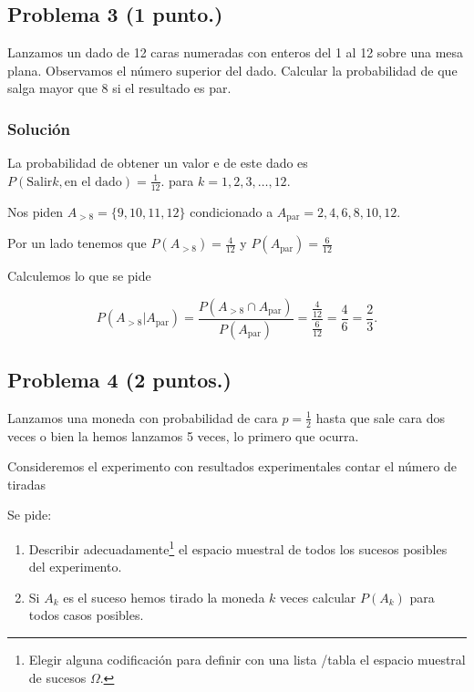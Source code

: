 \documentclass[
]{article}
\providecommand{\tightlist}{%
  \setlength{\itemsep}{0pt}\setlength{\parskip}{0pt}}
\begin{document}
\hypertarget{problema-3}{%
\subsection{\texorpdfstring{Problema 3
(\textbf{1 punto.})}{Problema 3 ()}}\label{problema-3}}

Lanzamos un dado de 12 caras numeradas con enteros del 1 al 12 sobre una
mesa plana. Observamos el número superior del dado. Calcular la
probabilidad de que salga mayor que 8 si el resultado es par.

\hypertarget{soluciuxf3n-2}{%
\subsubsection{Solución}\label{soluciuxf3n-2}}

La probabilidad de obtener un valor e de este dado es
\(P(\mbox{Salir} k ,\mbox{en el dado})=\frac{1}{12}.\) para
\(k=1,2,3,\ldots,12.\)

Nos piden \(A_{> 8}=\{9,10,11,12\}\) condicionado a
\(A_{\mbox{par}}={2,4,6,8,10,12}\).

Por un lado tenemos que \(P(A_{> 8})=\frac{4}{12}\) y
\(P(A_{\mbox{par}})=\frac{6}{12}\)

Calculemos lo que se pide

\[
P\left(A_{> 8}| A_{\mbox{par}}\right)=
\frac{ P\left(A_{> 8}\cap A_{\mbox{par}}\right)}{P\left(A_{\mbox{par}}\right)}=
\frac{\frac{4}{12}}{\frac{6}{12}}=\frac{4}{6}=\frac{2}{3}.
\]

\hypertarget{problema-4}{%
\subsection{\texorpdfstring{Problema 4
(\textbf{2 puntos.})}{Problema 4 ()}}\label{problema-4}}

Lanzamos una moneda con probabilidad de cara \(p=\frac{1}{2}\) hasta que
sale cara dos veces o bien la hemos lanzamos 5 veces, lo primero que
ocurra.

Consideremos el experimento con resultados experimentales contar el
número de tiradas

Se pide:

\begin{enumerate}
\def\labelenumi{\alph{enumi}.}
\tightlist
\item
  Describir
  adecuadamente\footnote{Elegir alguna codificación para definir con una lista /tabla el espacio muestral de sucesos $\Omega$.}
  el espacio muestral de todos los sucesos posibles del experimento.
\item
  Si \(A_k\) es el suceso hemos tirado la moneda \(k\) veces calcular
  \(P(A_k)\) para todos casos posibles.
\end{enumerate}
\end{document}

